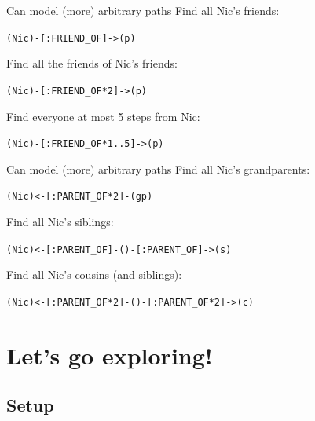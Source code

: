 \documentclass{beamer}
\begin{document}
\begin{frame}{Can model (more) arbitrary paths}
	Find all Nic's friends:
	
	\begin{center}
		\texttt{(Nic)-[:FRIEND\_OF]->(p)}
	\end{center}
	
	Find all the friends of Nic's friends:
	
	\begin{center}
		\texttt{(Nic)-[:FRIEND\_OF*2]->(p)}
	\end{center}
	
	Find everyone at most 5 steps from Nic:
	
	\begin{center}
		\texttt{(Nic)-[:FRIEND\_OF*1..5]->(p)}
	\end{center}
	
\end{frame}

\begin{frame}{Can model (more) arbitrary paths}
	Find all Nic's grandparents:
	
	\begin{center}
		\texttt{(Nic)<-[:PARENT\_OF*2]-(gp)}
	\end{center}
	
	Find all Nic's siblings:
	
	\begin{center}
		\texttt{(Nic)<-[:PARENT\_OF]-()-[:PARENT\_OF]->(s)}
	\end{center}
	
	Find all Nic's cousins (and siblings):
	
	\begin{center}
		\texttt{(Nic)<-[:PARENT\_OF*2]-()-[:PARENT\_OF*2]->(c)}
	\end{center}
	
\end{frame}

\section{Let's go exploring!}

\subsection{Setup}
\end{document}
